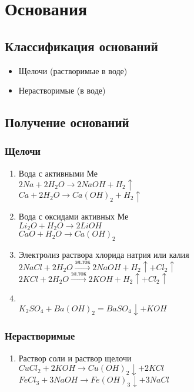 \newpage
\section{Основания}
\subsection{Классификация оснований}
\begin{itemize}
    \item Щелочи (растворимые в воде)
    \item Нерастворимые (в воде)
\end{itemize}



\subsection{Получение оснований}
\subsubsection{Щелочи}
\begin{enumerate}
    \item Вода с активными Ме\\
        $2Na + 2H_2O \rightarrow 2NaOH + H_2\uparrow$\\
        $Ca + 2H_2O \rightarrow Ca(OH)_2 + H_2\uparrow$

    \item Вода с оксидами активных Ме\\
        $Li_2O + H_2O \rightarrow 2LiOH$\\
        $CaO + H_2O \rightarrow Ca(OH)_2$

    \item Электролиз раствора хлорида натрия или калия\\
        $2NaCl + 2H_2O \stackrel{эл. ток}{\rightarrow} 2NaOH + H_2\uparrow + Cl_2\uparrow$\\
        $2KCl + 2H_2O \stackrel{эл. ток}{\rightarrow} 2KOH + H_2\uparrow + Cl_2\uparrow$
        
    \item {}\\
        $K_2SO_4 + Ba(OH)_2 = BaSO_4\downarrow + KOH$
\end{enumerate}


\subsubsection{Нерастворимые}
\begin{enumerate}
    \item Раствор соли и раствор щелочи\\
        $CuCl_2 + 2KOH \rightarrow Cu(OH)_2\downarrow + 2KCl$\\
        $FeCl_3 + 3NaOH \rightarrow Fe(OH)_3\downarrow + 3NaCl$
\end{enumerate}



